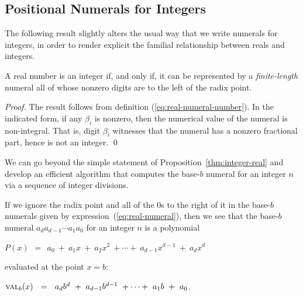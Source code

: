 \subsection{Positional Numerals for Integers}
\label{sec:special-numerals-N}


The following result slightly alters the usual way that we write numerals for integers, in order to render explicit the familial relationship between reals and integers.


\begin{prop}
\label{thm:integer-real}
A real number is an integer if, and only if, it can be represented by a {\em finite-length} numeral all of whose nonzero digits are to the left of the radix point.
\end{prop}

\begin{proof}
The result follows from definition (\ref{eq:real-numeral-number}).  In the indicated form, if any $\beta_i$ is nonzero, then the numerical value of the numeral is non-integral.  That is, digit $\beta_i$ witnesses that the numeral has a nonzero fractional part, hence is not an integer.  \qed
\end{proof}

\medskip

We can go beyond the simple statement of Proposition~\ref{thm:integer-real} and develop an efficient algorithm that computes the base-$b$ numeral for an integer $n$ via a sequence of integer divisions.

\bigskip

If we ignore the radix point and all of the $0$s to the right of it in the base-$b$ numerals given by expression~(\ref{eq:real-numeral}), then we see that the base-$b$ numeral $a_d a_{d-1} \cdots a_1 a_0$ for an integer $n$ is a polynomial

\smallskip

$P(x) \ \ = \ \ a_0 \ + \ a_1 x \ + \ a_2 x^2 \ + \cdots + \ a_{d-1} x^{d-1} \ + \ a_d x^d$

\smallskip

\noindent
evaluated at the point $x=b$:

\smallskip

$\mbox{\sc val}_{b}(x) \ \ = \ \ a_d b^d \ + \ a_{d-1} b^{d-1} \ + \cdots + \ a_1 b \ + \ a_0$.

